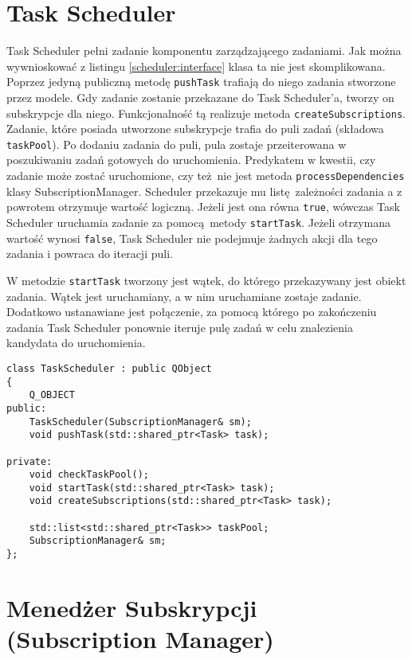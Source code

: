 \section{Task Scheduler} 
Task Scheduler pełni zadanie komponentu zarządzającego zadaniami. Jak można wywnioskować z listingu \ref{scheduler:interface} klasa ta nie jest skomplikowana. Poprzez jedyną publiczną metodę \lstinline$pushTask$ trafiają do niego zadania stworzone przez modele. Gdy zadanie zostanie przekazane do Task Scheduler'a, tworzy on subskrypcje dla niego. Funkcjonalność tą realizuje metoda \lstinline$createSubscriptions$. Zadanie, które posiada utworzone subskrypcje trafia do puli zadań (składowa \lstinline$taskPool$). Po dodaniu zadania do puli, pula zostaje przeiterowana w poszukiwaniu zadań gotowych do uruchomienia. Predykatem w kwestii, czy zadanie może zostać uruchomione, czy też nie jest metoda \lstinline$processDependencies$ klasy SubscriptionManager. Scheduler przekazuje mu listę zależności zadania a z powrotem otrzymuje wartość logiczną. Jeżeli jest ona równa \lstinline$true$, wówczas Task Scheduler uruchamia zadanie za pomocą metody \lstinline$startTask$. Jeżeli otrzymana wartość wynosi \lstinline$false$, Task Scheduler nie podejmuje żadnych akcji dla tego zadania i powraca do iteracji puli.

W metodzie \lstinline$startTask$ tworzony jest wątek, do którego przekazywany jest obiekt zadania. Wątek jest uruchamiany, a w nim uruchamiane zostaje zadanie. Dodatkowo ustanawiane jest połączenie, za pomocą którego po zakończeniu zadania Task Scheduler ponownie iteruje pulę zadań w celu znalezienia kandydata do uruchomienia. 

\begin{minipage}{\textwidth}
	\begin{lstlisting}[label=scheduler:interface, caption={Deklaracja klasy \lstinline$TaskScheduler$},alsoletter={()[].=}]
class TaskScheduler : public QObject
{
	Q_OBJECT
public:
	TaskScheduler(SubscriptionManager& sm);
	void pushTask(std::shared_ptr<Task> task);

private:
	void checkTaskPool();
	void startTask(std::shared_ptr<Task> task);
	void createSubscriptions(std::shared_ptr<Task> task);

	std::list<std::shared_ptr<Task>> taskPool;
	SubscriptionManager& sm;
};
	\end{lstlisting}
\end{minipage}

\section{Menedżer Subskrypcji (Subscription Manager)}

